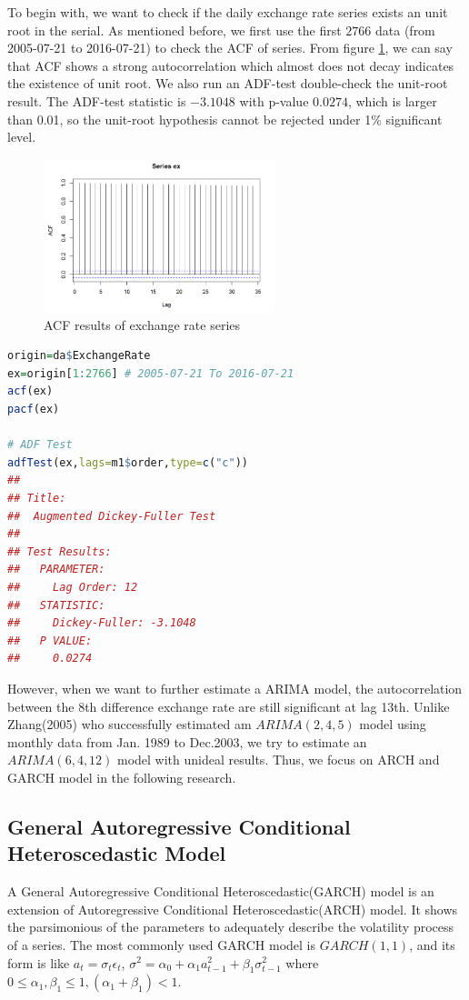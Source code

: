\documentclass[12pt, a4paper, titlepage]{article}
\begin{document}
To begin with, we want to check if the daily exchange rate series exists an unit root in the serial. As mentioned before, we first use the first $2766$ data (from 2005-07-21 to 2016-07-21) to check the ACF of series. From figure \ref{ACF}, we can say that ACF shows a strong autocorrelation which almost does not decay indicates the existence of unit root. We also run an ADF-test double-check the unit-root result. The ADF-test statistic is $-3.1048$ with p-value $0.0274$, which is larger than 0.01, so the unit-root hypothesis cannot be rejected under 1\% significant level.\\
\begin{figure}[h!]
\begin{center}
\caption{ACF results of exchange rate series}\label{ACF}
\includegraphics[width=0.6\textwidth]{ex_acf.png} 
\end{center}
\end{figure}
\begin{lstlisting}[language=R] 
origin=da$ExchangeRate
ex=origin[1:2766] # 2005-07-21 To 2016-07-21
acf(ex)
pacf(ex)

# ADF Test
adfTest(ex,lags=m1$order,type=c("c"))
## 
## Title:
##  Augmented Dickey-Fuller Test
## 
## Test Results:
##   PARAMETER:
##     Lag Order: 12
##   STATISTIC:
##     Dickey-Fuller: -3.1048
##   P VALUE:
##     0.0274 
\end{lstlisting}

However, when we want to further estimate a ARIMA model, the autocorrelation between the 8th difference exchange rate are still significant at lag 13th. Unlike Zhang(2005) who successfully estimated am $ARIMA(2,4,5)$ model using monthly data from Jan. 1989 to Dec.2003, we try to estimate an $ARIMA(6,4,12)$ model with unideal results. Thus, we focus on ARCH and GARCH model in the following research.

\subsection{General Autoregressive Conditional Heteroscedastic Model}
A General Autoregressive Conditional Heteroscedastic(GARCH) model is an extension of Autoregressive Conditional Heteroscedastic(ARCH) model. It shows the parsimonious of the parameters to adequately describe the volatility process of a series. The most commonly used GARCH model is $GARCH(1,1)$, and its form is like $a_t = \sigma_t \epsilon_t$, $\sigma^2 = \alpha_0 + \alpha_1 a_{t-1}^2 + \beta_1 \sigma_{t-1}^2$ where $0 \leq \alpha_1, \beta_1 \leq 1, (\alpha_1 + \beta_1) <1$. 
\end{document}
